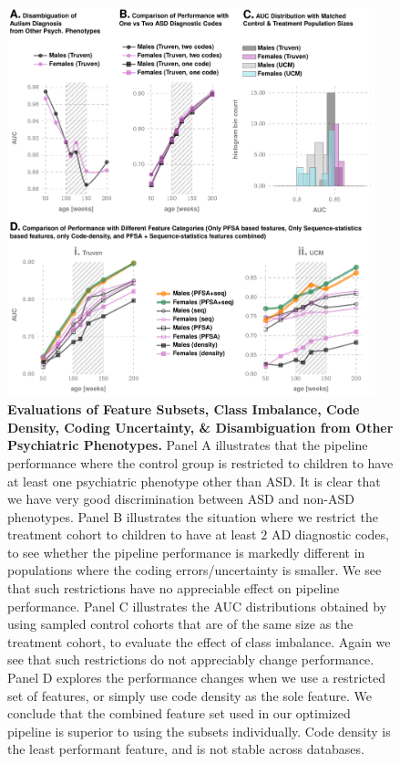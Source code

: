 \documentclass[onecolumn,,10pt]{IEEEtran}
\renewcommand{\captionN}[1]{\caption{\color{CadetBlue4!80!black} \sffamily \fontsize{9}{10}\selectfont #1  }}
\newif\iftikzX
\begin{document}
\begin{figure}[!ht]
  \tikzexternalenable
  \vspace{-10pt}
  
  \centering
\iftikzX

\else
  \includegraphics[width=0.95\textwidth]{Figures/External/sanitycheck}
  \fi 
  
 \captionN{\textbf{Evaluations of Feature Subsets, Class Imbalance, Code Density, Coding Uncertainty, \& Disambiguation from Other Psychiatric  Phenotypes.} Panel A illustrates that the pipeline performance where the control group is restricted to children to have at least one psychiatric phenotype other than ASD. It is clear that we have very good discrimination between ASD and non-ASD phenotypes. Panel B illustrates the situation where we restrict the treatment cohort to children to have at least $2$ AD diagnostic codes, to see whether the pipeline performance is markedly different in  populations where the coding errors/uncertainty is smaller. We see that such restrictions have no appreciable effect on  pipeline performance. Panel C illustrates the AUC distributions obtained by using sampled control cohorts that are of the same size as the treatment cohort, to evaluate the effect of class imbalance. Again we see that such restrictions do  not appreciably change performance. Panel D explores the performance changes when we use a restricted set of features, or simply use code density as the sole feature. We conclude that the combined feature set used in our optimized pipeline is superior to using the subsets individually. Code density is the least performant feature, and is not stable across databases. }\label{EXT-figcompsi}
\end{figure} 
\else
{}\label{EXT-figcompsi}
\fi
\end{document}
